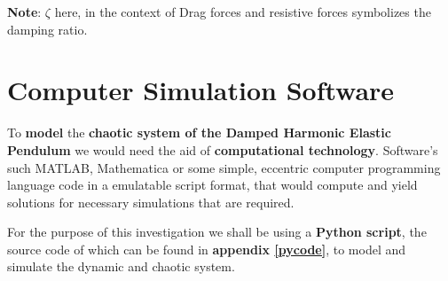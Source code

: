     {\textbf{Note}: $\zeta$ here, in the context of Drag forces and resistive forces symbolizes the damping ratio.}
            
\section{{Computer Simulation Software}}
        
    {To \textbf{model} the \textbf{chaotic system of the Damped Harmonic Elastic Pendulum} we would need the aid of \textbf{computational technology}. Software's such MATLAB, Mathematica or some simple, eccentric computer programming language code in a emulatable script format, that would compute and yield solutions for necessary simulations that are required.}
    
    {For the purpose of this investigation we shall be using a \textbf{Python script}, the source code of which can be found in \textbf{appendix \ref{pycode}}, to model and simulate the dynamic and chaotic system.}
        
        


